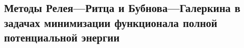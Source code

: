 

\subsection{Методы Релея—Ритца и Бубнова—Галеркина в задачах минимизации функционала полной потенциальной энергии}



